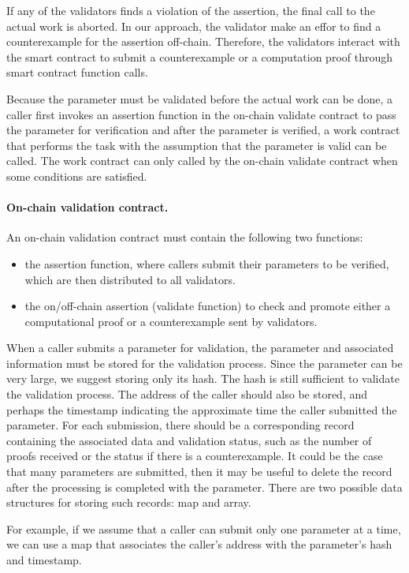 \documentclass[runningheads]{llncs}
\begin{document}
If any of the validators finds a violation of the assertion, the final call to the actual work is aborted. In our approach, the validator make an effor to find a counterexample for the assertion off-chain. Therefore, the validators interact with the smart contract to submit a  counterexample or a computation proof through smart contract function calls. 

Because the parameter must be validated before the actual work can be done, a caller first invokes an assertion function in the on-chain validate contract to pass the parameter for  verification and after the parameter is verified, a work contract that performs the task with the assumption that the parameter is valid can be called. The work contract can only called by the on-chain validate contract when some conditions are satisfied.

\paragraph{On-chain validation contract.} An on-chain validation contract must contain the following two functions:  

\begin{itemize}
\item the assertion function, where callers submit their parameters to be verified, which are then distributed to all validators. 
\item the on/off-chain assertion (validate function) to check and promote either a computational proof or a counterexample sent by validators.
\end{itemize}


When a caller submits a parameter for validation, the parameter and associated information must be stored for the validation process. Since the parameter can be very large, we suggest storing only its hash. The hash is still sufficient to validate the validation process. The address of the caller should also be stored, and perhaps the timestamp indicating the approximate time the caller submitted the parameter. For each submission, there should be a corresponding record containing the associated data and validation status, such as the number of proofs received or the status if there is a counterexample. It could be the case that many parameters are submitted, then it may be useful to delete the record after the processing is completed with the parameter. There are two possible data structures for storing such records: map and array. 

For example, if we assume that a caller can submit only one parameter at a time, we can use a map that associates the caller's address with the parameter's hash and timestamp.
\end{document}
